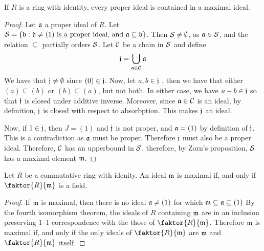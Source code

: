 \begin{proposition}\label{proposition_5.4.3}
  If $R$ is a ring with identity, every proper ideal is contained in a maximal
  ideal.
\end{proposition}
\begin{proof}
  Let $\mathfrak{a}$ a proper ideal of $R$. Let $\mathcal{S}=\{\mathfrak{b} : \mathfrak{b} \neq (1) \text{ is a proper
  ideal, and } \mathfrak{a} \subseteq \mathfrak{b} \}$. Then $\mathcal{S} \neq \emptyset$, as
  $\mathfrak{a} \in \mathcal{S}$, and the relation $\subseteq$ partially orders $\mathcal{S}$. Let
  $\mathcal{C}$ be a chain in $\mathcal{S}$ and define
  \begin{equation*}
    \mathfrak{j}=\bigcup_{\mathfrak{a} \in \mathcal{C}}{\mathfrak{a}}
  \end{equation*}
  We have that $\mathfrak{j} \neq \emptyset$ since  $(0) \in \mathfrak{j}$. Now, let
  $a,b \in \mathfrak{j}$ , then we have that either  $(a) \subseteq (b)$ or
  $(b) \subseteq (a)$, but not both. In either case, we have $a-b \in \mathfrak{j}$
  so that  $\mathfrak{j}$ is closed under additive inverse. Moreover, since
  $\mathfrak{a} \in \mathcal{C}$ is an ideal, by definition, $\mathfrak{j}$ is closed with respect to
  absorbption. This makes  $\mathfrak{j}$ an ideal.

  Now, if  $1 \in \mathfrak{j}$, then $J=(1)$ and $\mathfrak{j}$ is not proper, and $\mathfrak{a}=(1)$ by
  definition of $\mathfrak{j}$. This is a contradiction as $\mathfrak{a}$ must be
  proper. Therefore $\mathfrak{j}$ must also be a proper ideal. Therefore,
  $\mathcal{C}$ has an upperbound in $\mathcal{S}$, therefore, by Zorn's proposition,
  $\mathcal{S}$ has a maximal element $\mathfrak{m}$.
\end{proof}

\begin{proposition}\label{proposition_5.4.4}
  Let $R$ be a commutative ring with idenity. An ideal $\mathfrak{m}$ is maximal if,
  and only if $\faktor{R}{\mf}$ is a field.
\end{proposition}
\begin{proof}
  If $\mathfrak{m}$ is maximal, then there is no ideal $\mathfrak{a} \neq (1)$ for which
  $\mathfrak{m} \subseteq \mathfrak{a} \subseteq (1)$ By the fourth isomorphism theorem,
  the ideals of  $R$ containing $\mathfrak{m}$ are in an inclusion preserving 1--1
  correspondence with the those of $\faktor{R}{\mf}$. Therefore $\mathfrak{m}$ is
  maximal if, and only if the only ideals of $\faktor{R}{\mf}$ are
  $\mathfrak{m}$ and $\faktor{R}{\mf}$ itself.
\end{proof}

